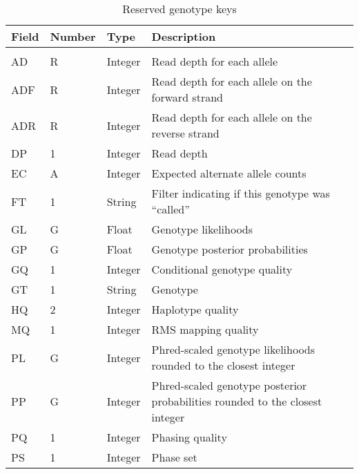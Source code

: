 \documentclass[8pt]{article}
\begin{document}
\begin{longtable}[c]{ | p{2.5cm} | p{1.5cm} | p{1.5cm} | p{10.3cm} | }
      \hline
      Field		& Number	& Type		& Description \\ \hline
  \endhead
      \hline
      \multicolumn{4}{l}{} \\
      \caption{\label{table:reserved-genotypes}Reserved genotype keys}
  \endfoot
      AD		& R		& Integer	& Read depth for each allele \\
      ADF		& R		& Integer	& Read depth for each allele on the forward strand \\
      ADR		& R		& Integer	& Read depth for each allele on the reverse strand \\
      DP		& 1		& Integer	& Read depth \\
      EC		& A		& Integer	& Expected alternate allele counts \\
      FT		& 1		& String	& Filter indicating if this genotype was ``called'' \\
      GL		& G		& Float		& Genotype likelihoods \\
      GP		& G		& Float		& Genotype posterior probabilities \\
      GQ		& 1		& Integer	& Conditional genotype quality \\
      GT		& 1		& String	& Genotype \\
      HQ		& 2		& Integer	& Haplotype quality \\
      MQ		& 1		& Integer	& RMS mapping quality \\
      PL		& G		& Integer	& Phred-scaled genotype likelihoods rounded to the closest integer \\
      PP		& G		& Integer	& Phred-scaled genotype posterior probabilities rounded to the closest integer \\
      PQ		& 1		& Integer	& Phasing quality \\
      PS		& 1		& Integer	& Phase set \\
\end{longtable}
\end{document}
